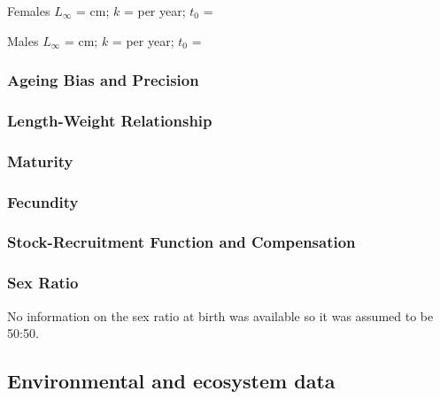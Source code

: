 \documentclass[
]{scrartcl}
\begin{document}
\begin{centering}

Females $L_{\infty}$ =  cm; $k$ =  per year; $t_0$ = 

Males $L_{\infty}$ =  cm; $k$ =  per year; $t_0$ = 

\end{centering}

\subsubsection{Ageing Bias and
Precision}\label{ageing-bias-and-precision}

\subsubsection{Length-Weight
Relationship}\label{length-weight-relationship}

\subsubsection{Maturity}\label{maturity}

\subsubsection{Fecundity}\label{fecundity}

\subsubsection{Stock-Recruitment Function and
Compensation}\label{stock-recruitment-function-and-compensation}

\subsubsection{Sex Ratio}\label{sex-ratio}

No information on the sex ratio at birth was available so it was assumed
to be 50:50.

\subsection{Environmental and ecosystem
data}\label{environmental-and-ecosystem-data}
\end{document}
